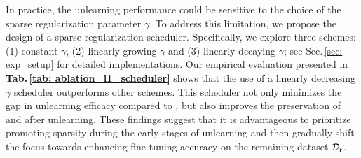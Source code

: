 

In practice,  the unlearning performance could be sensitive to the choice of the sparse regularization parameter $\gamma$. To address this limitation, we propose the design of a sparse regularization scheduler. Specifically, we explore three schemes: (1) constant $\gamma$, (2) linearly growing $\gamma$ and (3) linearly decaying $\gamma$; see Sec.\,\ref{sec: exp_setup} for detailed implementations. Our empirical evaluation presented in \textbf{Tab.\,\ref{tab: ablation_l1_scheduler}} shows that the use of a linearly decreasing $\gamma$ scheduler outperforms   other schemes.  
This scheduler not only minimizes the gap in unlearning efficacy compared to {\retrain}, but also improves the preservation of {\RA} and {\TA} after unlearning. 
These findings suggest that it is advantageous to prioritize promoting sparsity during the early stages of unlearning and then gradually shift the focus towards enhancing fine-tuning accuracy on the remaining dataset $\mathcal D_\mathrm{r}$.


